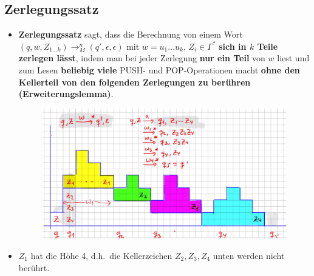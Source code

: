 \documentclass[ieeetran]{article}
\begin{document}
\subsection{Zerlegungssatz} %
\label{sub:zerlegungssatz}
\begin{itemize}
	\item \textbf{Zerlegungssatz} sagt, dass die Berechnung von einem Wort $(q,w,Z_{1 \ldots k}) \rightarrow^n_M (q',\epsilon,\epsilon)$ mit $w = u_1 \ldots u_k$, $Z_i \in \Gamma^*$ \textbf{sich in $k$ Teile zerlegen lässt}, indem man bei jeder Zerlegung \textbf{nur ein Teil} von $w$ liest und zum Lesen \textbf{beliebig viele} PUSH- und POP-Operationen macht \textbf{ohne den Kellerteil von den folgenden Zerlegungen zu berühren (Erweiterungslemma)}.

\begin{figure}[h!]
  \centering
  \includegraphics[width=0.7\linewidth]{zerlegungssatz}
  \label{fig:zerlegungssatz}
\end{figure}

\item $Z_1$ hat die Höhe 4, d.h.\ die Kellerzeichen $Z_2, Z_3, Z_4$ unten werden nicht berührt.

\end{itemize}
\end{document}
